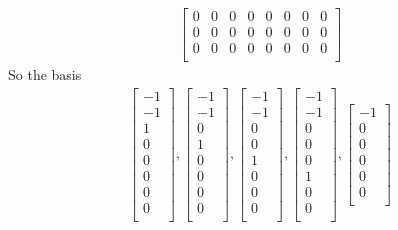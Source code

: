 \documentclass[a4paper,11pt]{article}
\begin{document}
\begin{enumerate}
\begin{align*}
\begin{bmatrix}
0 & 0 & 0 & 0 & 0 & 0 & 0 & 0 \\
0 & 0 & 0 & 0 & 0 & 0 & 0 & 0 \\
0 & 0 & 0 & 0 & 0 & 0 & 0 & 0 \\
\end{bmatrix}
\end{align*}
So the basis
\begin{align*}
\begin{bmatrix}
-1 \\
-1 \\
1 \\
0 \\
0 \\
0 \\
0 \\
0 \\
\end{bmatrix},
\begin{bmatrix}
-1 \\
-1 \\
0 \\
1 \\
0 \\
0 \\
0 \\
0 \\
\end{bmatrix},
\begin{bmatrix}
-1 \\
-1 \\
0 \\
0 \\
1 \\
0 \\
0 \\
0 \\
\end{bmatrix},
\begin{bmatrix}
-1 \\
-1 \\
0 \\
0 \\
0 \\
1 \\
0 \\
0 \\
\end{bmatrix},
\begin{bmatrix}
-1 \\
0 \\
0 \\
0 \\
0 \\
0 \\

\end{bmatrix}
\end{align*}
\end{enumerate}
\end{document}
